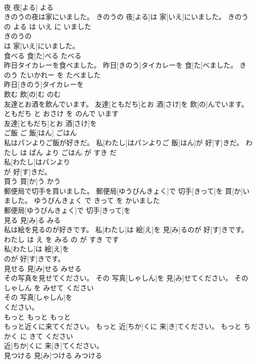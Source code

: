 \documentclass[8pt]{extreport}
\begin{document}
\begin{CJK}{UTF8}{min}
\\	夜	夜[よる]	よる	
\\	きのうの夜は家にいました。	きのうの 夜[よる]は 家[いえ]にいました。	きのう の よる は いえ に いました	
\\	きのうの
\\	は 家[いえ]にいました。		
\\	食べる	食[た]べる	たべる	
\\	昨日タイカレーを食べました。	昨日[きのう]タイカレーを 食[た]べました。	きのう たいかれー を たべました	
\\	昨日[きのう]タイカレーを
\\	飲む	飲[の]む	のむ	
\\	友達とお酒を飲んでいます。	友達[ともだち]とお 酒[さけ]を 飲[の]んでいます。	ともだち と おさけ を のんで います	
\\	友達[ともだち]とお 酒[さけ]を
\\	ご飯	ご 飯[はん]	ごはん	
\\	私はパンよりご飯が好きだ。	私[わたし]はパンよりご 飯[はん]が 好[す]きだ。	わたし は ぱん より ごはん が すき だ	
\\	私[わたし]はパンより
\\	が 好[す]きだ。		
\\	買う	買[か]う	かう	
\\	郵便局で切手を買いました。	郵便局[ゆうびんきょく]で 切手[きって]を 買[か]いました。	ゆうびんきょく で きって を かいました	
\\	郵便局[ゆうびんきょく]で 切手[きって]を
\\	見る	見[み]る	みる	
\\	私は絵を見るのが好きです。	私[わたし]は 絵[え]を 見[み]るのが 好[す]きです。	わたし は え を みる の が すき です	
\\	私[わたし]は 絵[え]を
\\	のが 好[す]きです。		
\\	見せる	見[み]せる	みせる	
\\	その写真を見せてください。	その 写真[しゃしん]を 見[み]せてください。	その しゃしん を みせて ください	
\\	その 写真[しゃしん]を
\\	ください。		
\\	もっと	もっと	もっと	
\\	もっと近くに来てください。	もっと 近[ちか]くに 来[き]てください。	もっと ちかく に きて ください	
\\	近[ちか]くに 来[き]てください。		
\\	見つける	見[み]つける	みつける	

\end{CJK}
\end{document}
